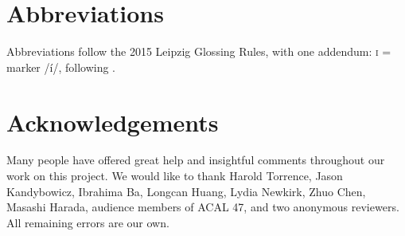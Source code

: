 \documentclass[output=paper,modfonts,nonflat,
hidelinks
]{langsci/langscibook}
\begin{document}
 
\section*{Abbreviations}\label{sec:duncan-et-al:abbreviations}

Abbreviations follow the 2015 Leipzig Glossing Rules, with one addendum: \textsc{i} =  marker /í/, following \citet{baker2010agreement}.

\section*{Acknowledgements}\label{sec:duncan-et-al:acknowledgments}

Many people have offered great help and insightful comments throughout our work on this project. We would like to thank Harold Torrence, Jason Kandybowicz, Ibrahima Ba, Longcan Huang, Lydia Newkirk, Zhuo Chen, Masashi Harada, audience members of ACAL 47, and two anonymous reviewers. All remaining errors are our own.

\sloppy
\printbibliography[heading=subbibliography,notkeyword=this]
\end{document}
